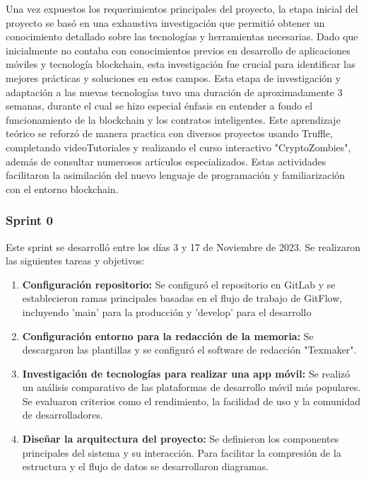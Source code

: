 Una vez expuestos los requerimientos principales del proyecto, la etapa inicial del proyecto se basó en una exhaustiva investigación que permitió obtener un conocimiento detallado sobre las tecnologías y herramientas necesarias. Dado que inicialmente no contaba con conocimientos previos en desarrollo de aplicaciones móviles y tecnología blockchain, esta investigación fue crucial para identificar las mejores prácticas y soluciones en estos campos. 
Esta etapa de investigación y adaptación a las nuevas tecnologías tuvo una duración de aproximadamente 3 semanas, durante el cual se hizo especial énfasis en entender a fondo el funcionamiento de la blockchain y los contratos inteligentes.
Este aprendizaje teórico se reforzó de manera practica con diversos proyectos usando Truffle, completando videoTutoriales y realizando el curso interactivo "CryptoZombies", además de consultar numerosos artículos especializados. Estas actividades facilitaron la asimilación del nuevo lenguaje de programación y familiarización con el entorno blockchain.


\subsubsection{Sprint 0}

Este sprint se desarrolló entre los días 3 y 17 de Noviembre de 2023. Se realizaron las siguientes tareas y objetivos:

\begin{enumerate}

\item \textbf{Configuración repositorio:} Se configuró el repositorio en GitLab y se establecieron ramas principales basadas en el flujo de trabajo de GitFlow, incluyendo 'main' para la producción y 'develop' para el desarrollo 

\item \textbf{Configuración entorno para la redacción de la memoria:} Se descargaron las plantillas y se configuró el software de redacción "Texmaker".

\item \textbf{Investigación de tecnologías para realizar una app móvil:} Se realizó un análisis comparativo de las plataformas de desarrollo móvil más populares. Se evaluaron criterios como el rendimiento, la facilidad de uso y la comunidad de desarrolladores.

\item \textbf{Diseñar la arquitectura del proyecto:} Se definieron los componentes principales del sistema y su interacción. Para facilitar la compresión de la estructura y el flujo de datos se desarrollaron diagramas.

\end{enumerate}


